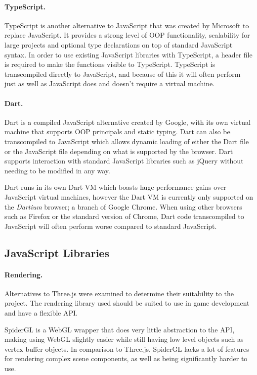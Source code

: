 \paragraph{TypeScript.}
TypeScript is another alternative to JavaScript that was created by Microsoft to replace JavaScript. It provides a strong level of OOP functionality, scalability for large projects and optional type declarations on top of standard JavaScript syntax.\cite{typescript} In order to use existing JavaScript libraries with TypeScript, a header file is required to make the functions visible to TypeScript. TypeScript is transcompiled directly to JavaScript, and because of this it will often perform just as well as JavaScript does and doesn't require a virtual machine.

\paragraph{Dart.}
Dart is a compiled JavaScript alternative created by Google, with its own virtual machine that supports OOP principals and static typing. Dart can also be transcompiled to JavaScript which allows dynamic loading of either the Dart file or the JavaScript file depending on what is supported by the browser.\cite{dart} Dart supports interaction with standard JavaScript libraries such as jQuery without needing to be modified in any way.

Dart runs in its own Dart VM which boasts huge performance gains over JavaScript virtual machines, however the Dart VM is currently only supported on the \emph{Dartium} browser; a branch of Google Chrome. When using other browsers such as Firefox or the standard version of Chrome, Dart code transcompiled to JavaScript will often perform worse compared to standard JavaScript.\cite{dartperformance}

\subsection{JavaScript Libraries}

\paragraph{Rendering.}
Alternatives to Three.js were examined to determine their suitability to the project. The rendering library used should be suited to use in game development and have a flexible API.

SpiderGL is a WebGL wrapper that does very little abstraction to the API, making using WebGL slightly easier while still having low level objects such as vertex buffer objects.\cite{spidergl} In comparison to Three.js, SpiderGL lacks a lot of features for rendering complex scene components, as well as being significantly harder to use.

